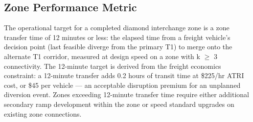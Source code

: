 \subsection{Zone Performance Metric}

The operational target for a completed diamond interchange zone is a zone transfer time of 12 minutes or less: the elapsed time from a freight vehicle's decision point (last feasible diverge from the primary T1) to merge onto the alternate T1 corridor, measured at design speed on a zone with k $\geq$ 3 connectivity. The 12-minute target is derived from the freight economics constraint: a 12-minute transfer adds 0.2 hours of transit time at \$225/hr ATRI cost, or \$45 per vehicle --- an acceptable disruption premium for an unplanned diversion event. Zones exceeding 12-minute transfer time require either additional secondary ramp development within the zone or speed standard upgrades on existing zone connections.
